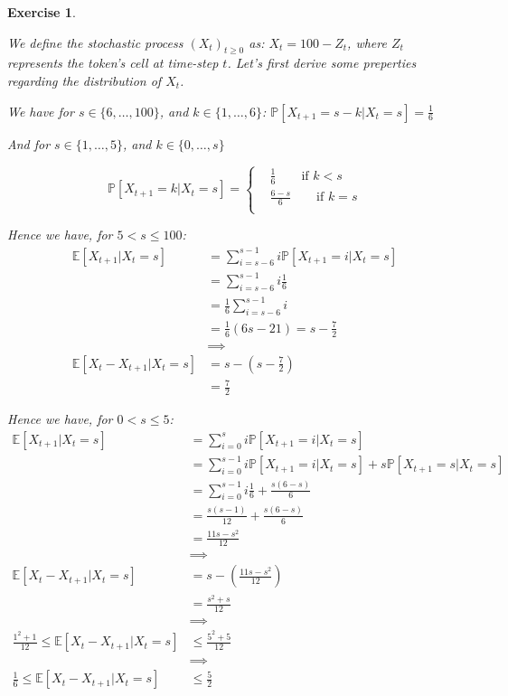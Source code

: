 \documentclass{article}
\newtheorem{exo}{Exercise}
\def\P{\mathbb{P}}
\def\E{\mathbb{E}}
\begin{document}
\begin{exo}{\ \\}

We define the stochastic process $(X_t)_{t \geq 0}$ as: $X_t = 100 - Z_t$, where $Z_t$ represents the token's cell at time-step $t$. Let's first derive some preperties regarding the distribution of $X_t$.
   

We have for $s \in \{6, \dots, 100\}$, and $k \in \{1, \dots, 6\}$: $\P[X_{t+1}= s-k | X_t =s] = \frac{1}{6} $


And for $s \in \{1, \dots ,5\}$, and $k \in \{0, \dots, s\}$

\[
\P[X_{t+1} = k| X_t = s] = 
\begin{cases}
    &\frac{1}{6}  \quad \quad \text{if } k < s \\
    &\frac{6-s}{6}  \quad \quad \text{if } k = s \\
\end{cases}
\]

Hence we have, for $5 < s\leq 100$:
\begin{align*}
    \E[X_{t+1}| X_t =s]
    &= \sum^{s-1}_{i=s-6} i \P[X_{t+1}=i | X_t = s] \\
    &= \sum^{s-1}_{i=s-6} i \frac{1}{6} \\
    &= \frac{1}{6} \sum^{s-1}_{i = s-6} i \\
    &= \frac{1}{6} (6s - 21) = s - \frac{7}{2}  \\
    & \implies \\
    \E[X_t - X_{t+1}| X_t = s] &= s - (s-\frac{7}{2}) \\
    &= \frac{7}{2} 
\end{align*}

Hence we have, for $0 < s\leq 5$:
\begin{align*}
    \E[X_{t+1}| X_t =s]
    &= \sum^{s}_{i=0} i \P[X_{t+1}=i | X_t = s] \\
    &= \sum^{s-1}_{i=0} i \P[X_{t+1}=i | X_t = s] 
    + s \P[X_{t+1}=s|X_t=s] \\
    &= \sum^{s-1}_{i=0} i \frac{1}{6} + \frac{s(6-s)}{6} \\
    &= \frac{s(s-1)}{12} + \frac{s(6-s)}{6}  \\
    &= \frac{11s - s^2}{12} \\ 
    & \implies \\
    \E[X_t - X_{t+1}| X_t = s] &= s - (\frac{11s - s^2}{12}) \\
    &= \frac{s^2 +s}{12} \\ 
    & \implies \\
    \frac{1^2 + 1}{12} \leq  \E[X_t - X_{t+1}| X_t = s] &\leq \frac{5^2 + 5}{12} \\ 
    & \implies \\
    \frac{1}{6} \leq  \E[X_t - X_{t+1}| X_t = s] &\leq \frac{5}{2} \\ 
\end{align*}


\end{exo}
\end{document}
